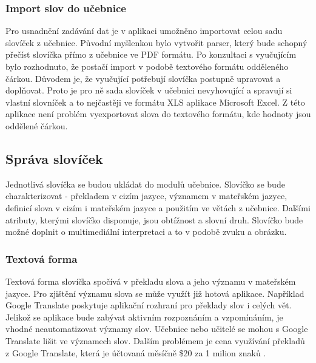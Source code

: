 \documentclass[a4paper,11pt,titlepage,fleqn]{article}
\begin{document}
        \subsubsection{Import slov do učebnice}
            Pro usnadnění zadávání dat je v aplikaci umožněno importovat celou sadu slovíček z učebnice. Původní myšlenkou bylo vytvořit parser, který bude schopný přečíst slovíčka přímo z učebnice ve PDF formátu. Po konzultaci s vyučujícím bylo rozhodnuto, že postačí import v podobě textového formátu odděleného čárkou. Důvodem je, že vyučující potřebují slovíčka postupně upravovat a doplňovat. Proto je pro ně sada slovíček v učebnici nevyhovující a spravují si vlastní slovníček a to nejčastěji ve formátu XLS aplikace Microsoft Excel. Z této aplikace není problém vyexportovat slova do textového formátu, kde hodnoty jsou oddělené čárkou.

    \subsection{Správa slovíček}

        Jednotlivá slovíčka se budou ukládat do modulů učebnice. Slovíčko se bude charakterizovat - překladem v cizím jazyce, významem v mateřském jazyce, definicí slova v cizím i mateřském jazyce a použitím ve větách z učebnice. Dalšími atributy, kterými slovíčko disponuje, jsou obtížnost a slovní druh. Slovíčko bude možné doplnit o multimediální interpretaci a to v podobě zvuku a obrázku.

        \subsubsection{Textová forma}
            Textová forma slovíčka spočívá v překladu slova a jeho významu v mateřském jazyce. Pro zjištění významu slova se může využít již hotová aplikace. Například Google Translate poskytuje aplikační rozhraní pro překlady slov i celých vět. Jelikož se aplikace bude zabývat aktivním rozpoznáním a vzpomínáním, je vhodné neautomatizovat významy slov. Učebnice nebo učitelé se mohou s Google Translate lišit ve významech slov. Dalším problémem je cena využívání překladů z Google Translate, která je účtovaná měsíčně \$20 za 1 milion znaků \cite{bib:google-api}.
\end{document}
